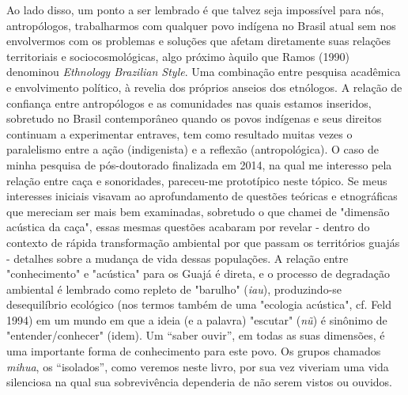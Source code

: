 Ao lado disso, um ponto a ser lembrado é que talvez seja impossível para
nós, antropólogos, trabalharmos com qualquer povo indígena no Brasil
atual sem nos envolvermos com os problemas e soluções que afetam
diretamente suas relações territoriais e sociocosmológicas, algo próximo
àquilo que Ramos (1990) denominou \emph{Ethnology Brazilian Style}.
Uma combinação entre pesquisa acadêmica e envolvimento político, à
revelia dos próprios anseios dos etnólogos. A relação de confiança entre
antropólogos e as comunidades nas quais estamos inseridos, sobretudo no
Brasil contemporâneo quando os povos indígenas e seus direitos continuam
a experimentar entraves, tem como resultado muitas vezes o paralelismo
entre a ação (indigenista) e a reflexão (antropológica). O caso de minha
pesquisa de pós-doutorado finalizada em 2014, na qual me interesso pela
relação entre caça e sonoridades, pareceu-me prototípico neste tópico.
Se meus interesses iniciais visavam ao aprofundamento de questões
teóricas e etnográficas que mereciam ser mais bem examinadas, sobretudo
o que chamei de "dimensão acústica da caça", essas mesmas questões
acabaram por revelar - dentro do contexto de rápida transformação
ambiental por que passam os territórios guajás - detalhes sobre a
mudança de vida dessas populações. A relação entre "conhecimento" e
"acústica" para os Guajá é direta, e o processo de degradação ambiental
é lembrado como repleto de "barulho" (\emph{iau}), produzindo-se
desequilíbrio ecológico (nos termos também de uma "ecologia acústica",
cf. Feld 1994) em um mundo em que a ideia (e a palavra) "escutar"
(\emph{nũ}) é sinônimo de "entender/conhecer" (idem). Um ``saber
ouvir'', em todas as suas dimensões, é uma importante forma de
conhecimento para este povo. Os grupos chamados \emph{mihua}, os
``isolados'', como veremos neste livro, por sua vez viveriam uma vida
silenciosa na qual sua sobrevivência dependeria de não serem vistos ou
ouvidos.

